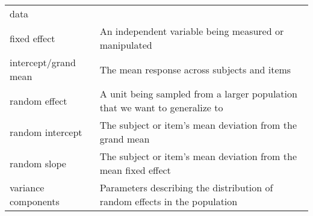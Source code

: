 \begin{appendix}
\begin{longtable}[]{@{}ll@{}}
\begin{minipage}[t]{0.67\columnwidth}
data\strut
\end{minipage}\tabularnewline
\begin{minipage}[t]{0.27\columnwidth}\raggedright
fixed effect\strut
\end{minipage} & \begin{minipage}[t]{0.67\columnwidth}\raggedright
An independent variable being measured or manipulated\strut
\end{minipage}\tabularnewline
\begin{minipage}[t]{0.27\columnwidth}\raggedright
intercept/grand mean\strut
\end{minipage} & \begin{minipage}[t]{0.67\columnwidth}\raggedright
The mean response across subjects and items\strut
\end{minipage}\tabularnewline
\begin{minipage}[t]{0.27\columnwidth}\raggedright
random effect\strut
\end{minipage} & \begin{minipage}[t]{0.67\columnwidth}\raggedright
A unit being sampled from a larger population that we want to generalize
to\strut
\end{minipage}\tabularnewline
\begin{minipage}[t]{0.27\columnwidth}\raggedright
random intercept\strut
\end{minipage} & \begin{minipage}[t]{0.67\columnwidth}\raggedright
The subject or item's mean deviation from the grand mean\strut
\end{minipage}\tabularnewline
\begin{minipage}[t]{0.27\columnwidth}\raggedright
random slope\strut
\end{minipage} & \begin{minipage}[t]{0.67\columnwidth}\raggedright
The subject or item's mean deviation from the mean fixed effect\strut
\end{minipage}\tabularnewline
\begin{minipage}[t]{0.27\columnwidth}\raggedright
variance components\strut
\end{minipage} & \begin{minipage}[t]{0.67\columnwidth}\raggedright
Parameters describing the distribution of random effects in the
population\strut
\end{minipage}\tabularnewline
\bottomrule
\end{longtable}
\end{appendix}
